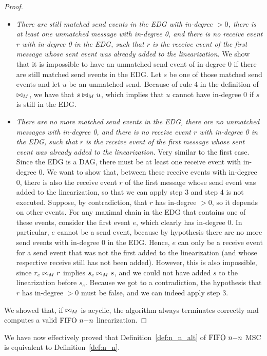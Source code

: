\begin{proof}
\begin{itemize}
	\item \emph{There are still matched send events in the EDG with in-degree $>0$, there is at least one unmatched message with in-degree 0, and there is no receive event $r$ with in-degree 0 in the EDG, such that $r$ is the receive event of the first message whose sent event was already added to the linearization}. We show that it is impossible to have an unmatched send event of in-degree 0 if there are still matched send events in the EDG. Let $s$ be one of those matched send events and let $u$ be an unmatched send. Because of rule 4 in the definition of $\bowtie_M$, we have that $s \bowtie_M u$, which implies that $u$ cannot have in-degree 0 if $s$ is still in the EDG.
	\item \emph{There are no more matched send events in the EDG, there are no unmatched messages with in-degree 0, and there is no receive event $r$ with in-degree 0 in the EDG, such that $r$ is the receive event of the first message whose sent event was already added to the linearization}. Very similar to the first case. Since the EDG is a DAG, there must be at least one receive event with in-degree 0. We want to show that, between these receive events with in-degree 0, there is also the receive event $r$ of the first message whose send event was added to the linearization, so that we can apply step 3 and step 4 is not executed. Suppose, by contradiction, that $r$ has in-degree $>0$, so it depends on other events. For any maximal chain in the EDG that contains one of these events, consider the first event $e$, which clearly has in-degree 0. In particular, $e$ cannot be a send event, because by hypothesis there are no more send events with in-degree 0 in the EDG. Hence, $e$ can only be a receive event for a send event that was not the first added to the linearization (and whose respective receive still has not been added). However, this is also impossible, since $r_e \bowtie_M r$ implies $s_e \bowtie_M s$, and we could not have added $s$ to the linearization before $s_e$. Because we got to a contradiction, the hypothesis that $r$ has in-degree $>0$ must be false, and we can indeed apply step 3.
\end{itemize}
We showed that, if $\bowtie_M$ is acyclic, the algorithm always terminates correctly and computes a valid $\text{FIFO } n\mathsf{-}n$ linearization.
\end{proof}

\noindent We have now effectively proved that Definition~\ref{def:n_n_alt} of $\text{FIFO } n\mathsf{-}n$ MSC is equivalent to Definition~\ref{def:n_n}.

